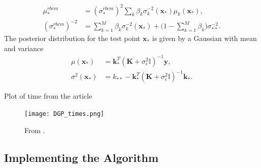 \documentclass[twoside,english]{uiofysmaster}
\begin{document}
\begin{align}
\mu_*^{rbcm} &= (\sigma_*^{rbcm})^2 \sum_k \beta_k \sigma_k^{-2} (\textbf{x}_*) \mu_k (\textbf{x}_*),\\
(\sigma_*^{rbcm})^{-2} &= \sum_{k=1}^M \beta_k \sigma_k^{-2} (\textbf{x}_*) + \big(1 - \sum_{k=1}^M \beta_k \big) \sigma_{**}^{-2}.
\end{align}
The posterior distribution for the test point $\textbf{x}_*$ is given by a Gaussian with mean and variance
\begin{align}
\mu (\textbf{x}_*) &= \textbf{k}_*^T (\textbf{K} + \sigma_{\epsilon}^2 \mathbb{I})^{-1} \textbf{y},\\
\sigma^2(\textbf{x}_*) &= k_{**} - \textbf{k}_*^T(\textbf{K} + \sigma_{\epsilon}^2 \mathbb{I})^{-1} \textbf{k}_*.
\end{align}




Plot of time from the article 

\begin{figure}
\centering
\texttt{[image: DGP\_times.png]}
\caption{From \cite{deisenroth2015distributed}.}
\end{figure}

\subsection{Implementing the Algorithm}
\end{document}
